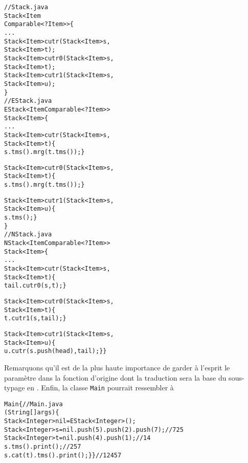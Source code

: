 \begin{alltt}
// Stack.java
\public \abstractX \class Stack<Item
\hfill\extends Comparable<? \super Item>> \{
  ...
  \public    \abstractX Stack<Item> cutr(\final Stack<Item> s,
                                      \final Stack<Item> t);
  \protectedX \abstractX Stack<Item> cutr0(\final Stack<Item> s,
                                       \final Stack<Item> t);
  \protectedX \abstractX Stack<Item> cutr1(\final Stack<Item> s,
                                       \final Stack<Item> u);
\}
// EStack.java
\public \class EStack<Item \extends Comparable<? \super Item>> 
       \extends Stack<Item> \{
  ...
  \public Stack<Item> cutr(\final Stack<Item> s,
                          \final Stack<Item> t) \{
    \return s.tms().mrg(t.tms()); \}

  \protectedX Stack<Item> cutr0(\final Stack<Item> s,
                              \final Stack<Item> t) \{
    \return s.tms().mrg(t.tms()); \}

  \protectedX Stack<Item> cutr1(\final Stack<Item> s,
                              \final Stack<Item> u) \{
    \return s.tms(); \}
\}
// NStack.java
\public \class NStack<Item \extends Comparable<? \super Item>>
       \extends Stack<Item> \{
  ...
  \public Stack<Item> cutr(\final Stack<Item> s,
                          \final Stack<Item> t) \{
    \return tail.cutr0(s,t); \}

  \protectedX Stack<Item> cutr0(\final Stack<Item> s,
                              \final Stack<Item> t) \{
    \return t.cutr1(s,tail); \}

  \protectedX Stack<Item> cutr1(\final Stack<Item> s,
                              \final Stack<Item> u) \{
    \return u.cutr(s.push(head),tail); \} \}
\end{alltt}
Remarquons qu'il est de la plus haute importance de garder à l'esprit
le paramètre dans la fonction d'origine dont la traduction sera la
base du sous-typage en \Java. Enfin, la classe \texttt{Main} pourrait
ressembler à
\begin{alltt}
\public \class Main \{\hfill// Main.java
  \public \static \void \main (String[] args) \{
    Stack<Integer> nil = \new EStack<Integer>();
    Stack<Integer> s = nil.push(5).push(2).push(7);\hfill// 7 2 5
    Stack<Integer> t = nil.push(4).push(1);\hfill// 1 4
    s.tms().print();\hfill// 2 5 7
    s.cat(t).tms().print(); \} \}\hfill// 1 2 4 5 7
\end{alltt}

